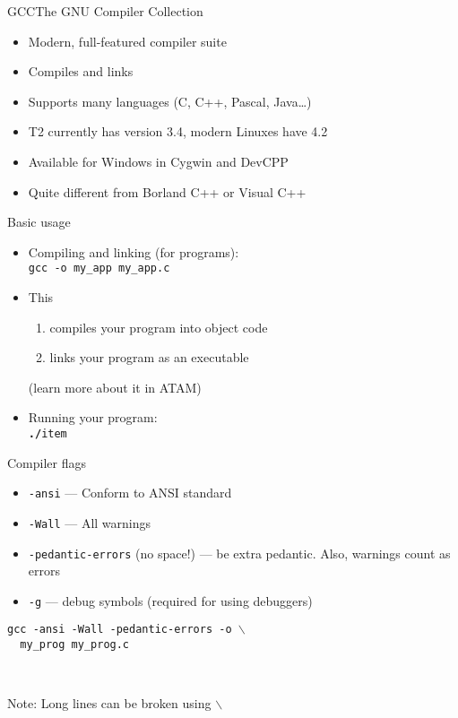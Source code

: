 \documentclass[handout]{beamer}
\begin{document}
\begin{frame}{GCC}{The GNU Compiler Collection}
  \begin{itemize}
    \item Modern, full-featured compiler suite
    \item Compiles and links
    \item Supports many languages (C, C++, Pascal, Java\ldots)
    \item T2 currently has version 3.4, modern Linuxes have 4.2
    \item Available for Windows in Cygwin and DevCPP
      \pause
    \item Quite different from Borland C++ or Visual C++
  \end{itemize}
\end{frame}

\begin{frame}{Basic usage}
  \begin{itemize}
    \item Compiling and linking (for programs):\\
      \texttt{gcc -o my\_app my\_app.c} \\
    \item This
      \begin{enumerate}
        \item compiles your program into object code
        \item links your program as an executable
      \end{enumerate}
      (learn more about it in ATAM)
    \item Running your program:\\
      \texttt{\textbf{./}item}
  \end{itemize}
\end{frame}

\begin{frame}{Compiler flags}
  \begin{itemize}
    \item \texttt{-ansi} --- Conform to ANSI standard
    \item \texttt{-Wall} --- All warnings
    \item \texttt{-pedantic-errors} (no space!) --- be extra pedantic. Also,
      warnings count as errors
    \item \texttt{-g} --- debug symbols (required for using debuggers)
  \end{itemize}

  \texttt{gcc -ansi -Wall -pedantic-errors -o $\backslash$ \\
  ~~my\_prog my\_prog.c}

~

{\tiny Note: Long lines can be broken using $\backslash$}
\end{frame}
\end{document}
